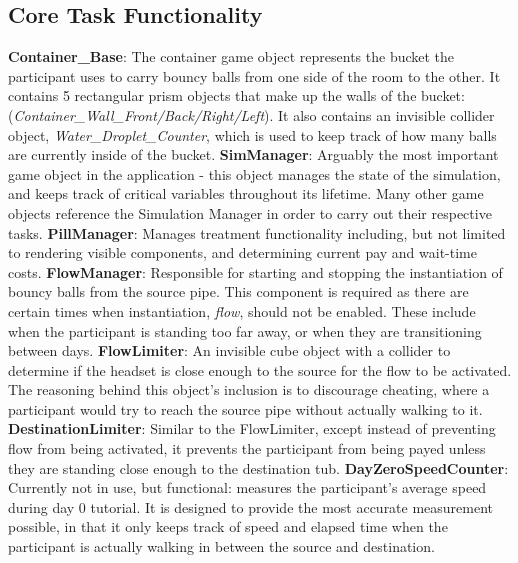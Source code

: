 \documentclass{article}
\begin{document}
\subsection*{Core Task Functionality} 
\textbf{Container\_Base}: The container game object represents the bucket the participant uses to carry bouncy balls from one side of the room to the other. It contains 5 rectangular prism objects that make up the walls of the bucket: (\textit{Container\_Wall\_Front\slash Back\slash Right\slash Left}). It also contains an invisible collider object, \textit{Water\_Droplet\_Counter}, which is used to keep track of how many balls are currently inside of the bucket.\newline \newline
\textbf{SimManager}: Arguably the most important game object in the application - this object manages the state of the simulation, and keeps track of critical variables throughout its lifetime. Many other game objects reference the Simulation Manager in order to carry out their respective tasks.\newline \newline
\textbf{PillManager}: Manages treatment functionality including, but not limited to rendering visible components, and determining current pay and wait-time costs.\newline \newline
\textbf{FlowManager}: Responsible for starting and stopping the instantiation of bouncy balls from the source pipe. This component is required as there are certain times when instantiation, \textit{flow}, should not be enabled. These include when the participant is standing too far away, or when they are transitioning between days. \newline \newline
\textbf{FlowLimiter}: An invisible cube object with a collider to determine if the headset is close enough to the source for the flow to be activated. The reasoning behind this object's inclusion is to discourage cheating, where a participant would try to reach the source pipe without actually walking to it. \newline \newline
\textbf{DestinationLimiter}: Similar to the FlowLimiter, except instead of preventing flow from being activated, it prevents the participant from being payed unless they are standing close enough to the destination tub.\newline \newline
\textbf{DayZeroSpeedCounter}: Currently not in use, but functional: measures the participant's average speed during day 0 tutorial. It is designed to provide the most accurate measurement possible, in that it only keeps track of speed and elapsed time when the participant is actually walking in between the source and destination.\newline \newline
\end{document}
